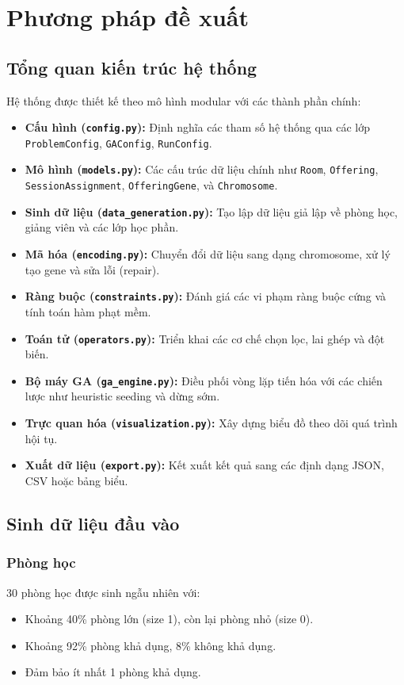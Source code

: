 \section{Phương pháp đề xuất}

\subsection{Tổng quan kiến trúc hệ thống}
Hệ thống được thiết kế theo mô hình modular với các thành phần chính:

\begin{itemize}
    \item \textbf{Cấu hình (\texttt{config.py}):} Định nghĩa các tham số hệ thống qua các lớp \texttt{ProblemConfig}, \texttt{GAConfig}, \texttt{RunConfig}.
    \item \textbf{Mô hình (\texttt{models.py}):} Các cấu trúc dữ liệu chính như \texttt{Room}, \texttt{Offering}, \texttt{SessionAssignment}, \texttt{OfferingGene}, và \texttt{Chromosome}.
    \item \textbf{Sinh dữ liệu (\texttt{data\_generation.py}):} Tạo lập dữ liệu giả lập về phòng học, giảng viên và các lớp học phần.
    \item \textbf{Mã hóa (\texttt{encoding.py}):} Chuyển đổi dữ liệu sang dạng chromosome, xử lý tạo gene và sửa lỗi (repair).
    \item \textbf{Ràng buộc (\texttt{constraints.py}):} Đánh giá các vi phạm ràng buộc cứng và tính toán hàm phạt mềm.
    \item \textbf{Toán tử (\texttt{operators.py}):} Triển khai các cơ chế chọn lọc, lai ghép và đột biến.
    \item \textbf{Bộ máy GA (\texttt{ga\_engine.py}):} Điều phối vòng lặp tiến hóa với các chiến lược như heuristic seeding và dừng sớm.
    \item \textbf{Trực quan hóa (\texttt{visualization.py}):} Xây dựng biểu đồ theo dõi quá trình hội tụ.
    \item \textbf{Xuất dữ liệu (\texttt{export.py}):} Kết xuất kết quả sang các định dạng JSON, CSV hoặc bảng biểu.
\end{itemize}

\subsection{Sinh dữ liệu đầu vào}

\subsubsection{Phòng học}
30 phòng học được sinh ngẫu nhiên với:
\begin{itemize}
    \item Khoảng 40\% phòng lớn (size 1), còn lại phòng nhỏ (size 0).
    \item Khoảng 92\% phòng khả dụng, 8\% không khả dụng.
    \item Đảm bảo ít nhất 1 phòng khả dụng.
\end{itemize}

